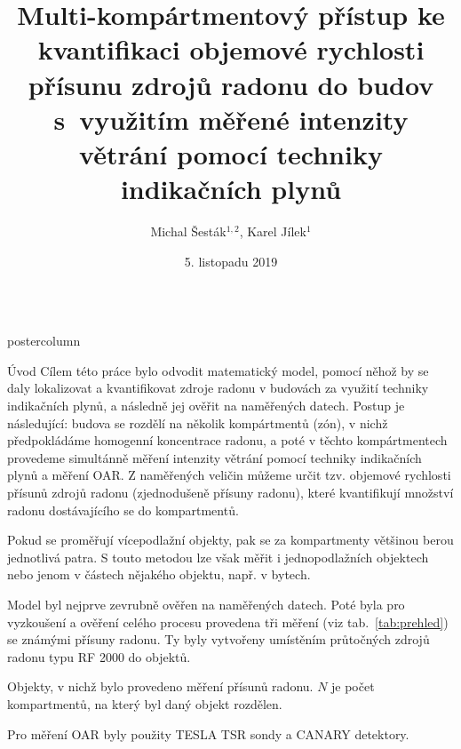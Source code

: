 \documentclass{beamer}
\title{\huge Multi-kompártmentový přístup ke kvantifikaci  objemové rychlosti přísunu zdrojů radonu do budov s využitím měřené intenzity větrání pomocí techniky indikačních plynů}
\author[michal.sestak@suro.cz]{Michal Šesták$^{1,2}$, Karel Jílek$^{1}$}
\institute[SÚRO]{$^{1}$Státní ústav radiační ochrany, v. v. i. \\ $^{2}$Fakulta jaderná a fyzikálně inženýrská, ČVUT v Praze}
\date{5. listopadu 2019}
\newlength{\columnheight}
\begin{document}
\shorthandoff{-}
\begin{frame}
\begin{columns}
	\begin{column}{.43\textwidth}
		\begin{beamercolorbox}[center]{postercolumn}
			\begin{minipage}{.98\textwidth}  %
				\parbox[t][\columnheight]{\textwidth}{ %
\begin{myblock}{Úvod}
Cílem této práce bylo odvodit matematický model, pomocí něhož by se daly lokalizovat a kvantifikovat zdroje radonu v budovách za využití techniky indikačních plynů, a následně jej ověřit na naměřených datech. Postup je následující: budova se rozdělí na několik kompártmentů (zón), v nichž předpokládáme homogenní koncentrace radonu, a poté v těchto kompártmentech provedeme simultánně měření intenzity větrání pomocí techniky indikačních plynů a měření OAR. Z naměřených veličin můžeme určit tzv. objemové rychlosti přísunů zdrojů radonu (zjednodušeně přísuny radonu), které kvantifikují množství radonu dostávajícího se do kompartmentů.

Pokud se proměřují vícepodlažní objekty, pak se za kompartmenty většinou berou jednotlivá patra. S touto metodou lze však měřit i jednopodlažních objektech nebo jenom v částech nějakého objektu, např. v bytech.

Model byl nejprve zevrubně ověřen na naměřených datech. Poté byla pro vyzkoušení a ověření celého procesu provedena tři měření (viz tab.~\ref{tab:prehled}) se známými přísuny radonu. Ty byly vytvořeny umístěním průtočných zdrojů radonu typu RF 2000 do objektů.
\begin{table}
    \scriptsize
    \centering
    \caption{Objekty, v nichž bylo provedeno měření přísunů radonu. $N$ je počet kompartmentů, na který byl daný objekt rozdělen.}
    \label{tab:prehled}
    
\end{table}

Pro měření OAR byly použity TESLA TSR sondy a CANARY detektory.


\end{myblock}\vfill


}
\end{minipage}
\end{beamercolorbox}
\end{column}
\end{columns}
\end{frame}
\end{document}

